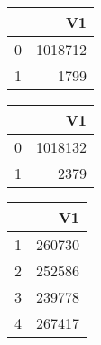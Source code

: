 \bigskip\bigskip
\centering
\begin{tabular}{rr}
  \hline
 & V1 \\ 
  \hline
0 & 1018712 \\ 
  1 & 1799 \\ 
   \hline
\end{tabular}

\bigskip\bigskip
\centering
\begin{tabular}{rr}
  \hline
 & V1 \\ 
  \hline
0 & 1018132 \\ 
  1 & 2379 \\ 
   \hline
\end{tabular}

\bigskip\bigskip
\centering
\begin{tabular}{rr}
  \hline
 & V1 \\ 
  \hline
1 & 260730 \\ 
  2 & 252586 \\ 
  3 & 239778 \\ 
  4 & 267417 \\ 
   \hline
\end{tabular}

